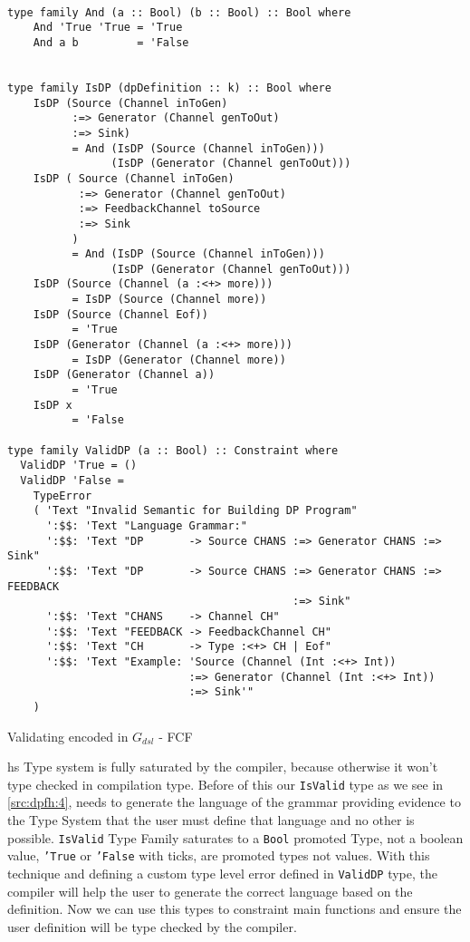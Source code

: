 \begin{listing}[H]
  \begin{verbatim}

type family And (a :: Bool) (b :: Bool) :: Bool where
    And 'True 'True = 'True
    And a b         = 'False
  

type family IsDP (dpDefinition :: k) :: Bool where
    IsDP (Source (Channel inToGen)
          :=> Generator (Channel genToOut)
          :=> Sink)
          = And (IsDP (Source (Channel inToGen))) 
                (IsDP (Generator (Channel genToOut)))
    IsDP ( Source (Channel inToGen)
           :=> Generator (Channel genToOut)
           :=> FeedbackChannel toSource 
           :=> Sink 
          )
          = And (IsDP (Source (Channel inToGen))) 
                (IsDP (Generator (Channel genToOut)))
    IsDP (Source (Channel (a :<+> more)))     
          = IsDP (Source (Channel more))
    IsDP (Source (Channel Eof))               
          = 'True
    IsDP (Generator (Channel (a :<+> more)))  
          = IsDP (Generator (Channel more))
    IsDP (Generator (Channel a))              
          = 'True
    IsDP x                                    
          = 'False
     
type family ValidDP (a :: Bool) :: Constraint where
  ValidDP 'True = ()
  ValidDP 'False = 
    TypeError
    ( 'Text "Invalid Semantic for Building DP Program"
      ':$$: 'Text "Language Grammar:"
      ':$$: 'Text "DP       -> Source CHANS :=> Generator CHANS :=> Sink"
      ':$$: 'Text "DP       -> Source CHANS :=> Generator CHANS :=> FEEDBACK 
                                            :=> Sink"
      ':$$: 'Text "CHANS    -> Channel CH"
      ':$$: 'Text "FEEDBACK -> FeedbackChannel CH"
      ':$$: 'Text "CH       -> Type :<+> CH | Eof"
      ':$$: 'Text "Example: 'Source (Channel (Int :<+> Int)) 
                            :=> Generator (Channel (Int :<+> Int)) 
                            :=> Sink'"
    )
  \end{verbatim}
  \caption{Validating encoded in $G_{dsl}$ - FCF}
  \label{src:dpfh:4}
\end{listing}

\acrshort{hs} Type system is fully saturated by the compiler, because otherwise it won't type checked in compilation type. 
Before of this our \texttt{IsValid} type as we see in \autoref{src:dpfh:4}, needs to generate the language
of the grammar providing evidence to the Type System that the user must define that language and no other is possible. 
\texttt{IsValid} Type Family saturates to a \texttt{Bool} promoted Type, not a boolean value, \texttt{'True} or 
\texttt{'False} with ticks, are promoted types not values. With this technique and defining a custom type level error defined 
in \texttt{ValidDP} type, the compiler will help the user to generate the correct language based on the definition.
Now we can use this types to constraint main functions and ensure the user definition will be type checked by the compiler.

